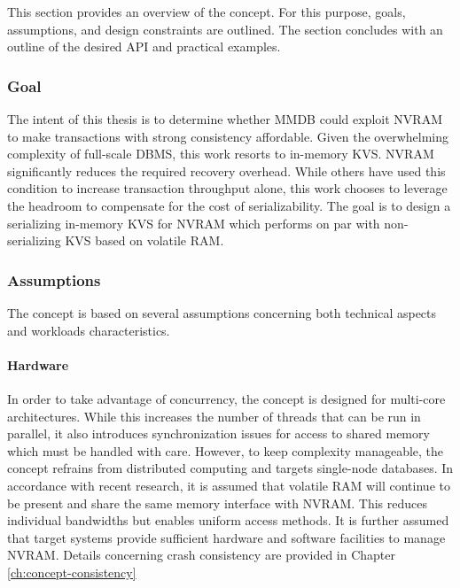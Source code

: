 This section provides an overview of the concept. For this purpose, goals,
assumptions, and design constraints are outlined. The section concludes with an
outline of the desired \ac{API} and practical examples.

\subsubsection{Goal}

The intent of this thesis is to determine whether \ac{MMDB} could exploit
\ac{NVRAM} to make transactions with strong consistency affordable. Given the
overwhelming complexity of full-scale \ac{DBMS}, this work resorts to in-memory
\ac{KVS}. \ac{NVRAM} significantly reduces the required recovery overhead. While
others have used this condition to increase transaction throughput alone,
this work chooses to leverage the headroom to compensate for the cost of
serializability. The goal is to design a serializing in-memory \ac{KVS} for
\ac{NVRAM} which performs on par with non-serializing \ac{KVS} based on volatile
\ac{RAM}.

\subsubsection{Assumptions}

The concept is based on several assumptions concerning both technical aspects
and workloads characteristics.

\paragraph{Hardware}

In order to take advantage of concurrency, the concept is designed for
multi-core architectures. While this increases the number of threads that can be
run in parallel, it also introduces synchronization issues for access to shared
memory which must be handled with care. However, to keep complexity manageable,
the concept refrains from distributed computing and targets single-node
databases. In accordance with recent research, it is assumed that volatile
\ac{RAM} will continue to be present and share the same memory interface with
\ac{NVRAM}. This reduces individual bandwidths but enables uniform access
methods. It is further assumed that target systems provide sufficient hardware
and software facilities to manage \ac{NVRAM}. Details concerning crash
consistency are provided in Chapter \ref{ch:concept-consistency}

